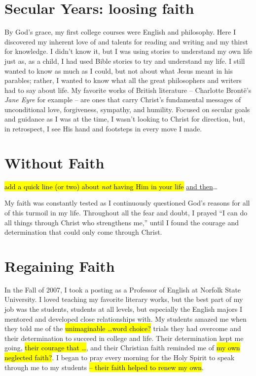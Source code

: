 \documentclass{report}%
\begin{document}
\section*{Secular Years: loosing faith}
By God's grace, my first college courses were English and philosophy. 
Here I discovered my inherent love of and talents for reading and writing and my thirst for knowledge.  
I didn't know it, but I was using stories to understand my own life just as, as a child,  I had used Bible stories to try and  understand my life. I still wanted to know as much as I could, but not about what Jesus meant in his parables; rather, I wanted to know what all the great philosophers and writers had to say about life. 
My favorite works of British literature -- Charlotte Bront\"e's \emph{Jane Eyre} for example -- are ones that carry Christ's fundamental messages of unconditional love, forgiveness, sympathy, and humility. 
Focused on secular goals and guidance as I was at the time, I wasn't looking to Christ for direction, but, in retrospect, I see His hand and footsteps in every move I made. 


\section*{Without Faith}
\hl{add a quick line (or two) about \emph{not} having Him in your life} \ul{and then}\dots{}


My faith was constantly tested as I continuously questioned God's reasons for all of this turmoil in my life. 
Throughout all the fear and doubt, I prayed ``I can do all things through Christ who strengthens me,'' until I found the courage and determination that could only come through Christ. 




\section*{Regaining Faith}
In the Fall of 2007, I took a posting as a Professor of English  at Norfolk State University. 
I loved teaching my favorite literary works, but the best part of my job was the students, students at all levels, but especially the English majors I mentored and developed close relationships with.
My students amazed me when they told me of the \hl{unimaginable  \dots word choice?} trials they had overcome and their determination to succeed in college and life. 
Their determination kept me going, \hl{their courage that \dots}, and their Christian faith reminded me of \hl{my own neglected faith?}. 
I began to pray every morning for the Holy Spirit to speak through me to my students \hl{-- their faith helped to renew my own}.  %
\end{document}
